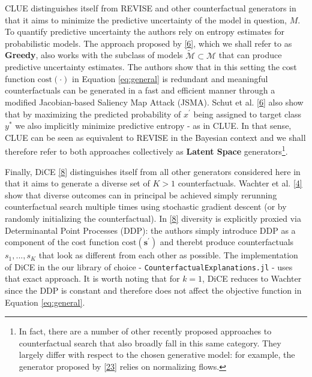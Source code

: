 \documentclass[conference,final,]{IEEEtran}
\begin{document}
CLUE distinguishes itself from REVISE and other counterfactual generators in that it aims to minimize the predictive uncertainty of the model in question, \(M\). To quantify predictive uncertainty the authors rely on entropy estimates for probabilistic models. The approach proposed by \protect\hyperlink{ref-schut2021generating}{{[}6{]}}, which we shall refer to as \textbf{Greedy}, also works with the subclass of models \(\tilde{\mathcal{M}}\subset\mathcal{M}\) that can produce predictive uncertainty estimates. The authors show that in this setting the cost function \(\text{cost}(\cdot)\) in Equation \eqref{eq:general} is redundant and meaningful counterfactuals can be generated in a fast and efficient manner through a modified Jacobian-based Saliency Map Attack (JSMA). Schut et al. \protect\hyperlink{ref-schut2021generating}{{[}6{]}} also show that by maximizing the predicted probability of \(x^\prime\) being assigned to target class \(y^*\) we also implicitly minimize predictive entropy - as in CLUE. In that sense, CLUE can be seen as equivalent to REVISE in the Bayesian context and we shall therefore refer to both approaches collectively as \textbf{Latent Space} generators\footnote{In fact, there are a number of other recently proposed approaches to counterfactual search that also broadly fall in this same category. They largely differ with respect to the chosen generative model: for example, the generator proposed by \protect\hyperlink{ref-dombrowski2021diffeomorphic}{{[}23{]}} relies on normalizing flows.}.

Finally, DiCE \protect\hyperlink{ref-mothilal2020explaining}{{[}8{]}} distinguishes itself from all other generators considered here in that it aims to generate a diverse set of \(K>1\) counterfactuals. Wachter et al. \protect\hyperlink{ref-wachter2017counterfactual}{{[}4{]}} show that diverse outcomes can in principal be achieved simply rerunning counterfactual search multiple times using stochastic gradient descent (or by randomly initializing the counterfactual). In \protect\hyperlink{ref-mothilal2020explaining}{{[}8{]}} diversity is explicitly proxied via Determinantal Point Processes (DDP): the authors simply introduce DDP as a component of the cost function \(\text{cost}(\mathbf{s}^\prime)\) and therebt produce counterfactuals \(s_1, ... , s_K\) that look as different from each other as possible. The implementation of DiCE in the our library of choice - \texttt{CounterfactualExplanations.jl} - uses that exact approach. It is worth noting that for \(k=1\), DiCE reduces to Wachter since the DDP is constant and therefore does not affect the objective function in Equation \eqref{eq:general}.
\end{document}
